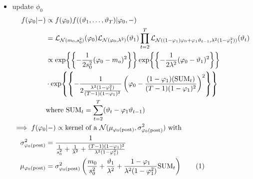 \documentclass[12pt,	%
	a4paper,		%
	twoside,		%
	openright,		%
	titlepage,%
	]{book}
\theoremstyle{definition}
\begin{document}
\begin{itemize}
\item update $\phi_0$
\begin{align*}
        f(\phi_0|-) &\propto f(\phi_0) f((\theta_1,\ldots,\theta_T)|\phi_0,-) \\
        &= \law_{\N(m_0,s^2_0)}(\phi_0) \law_{\N(\phi_0,\lambda^2)}(\theta_1) \prod_{t=2}^T \L_{\N((1-\phi_1)\phi_0 + \phi_1\theta_{t-1},\lambda^2(1-\phi_1^2))}(\theta_t)\\
        &\propto \exp{\left\{-\frac{1}{2s_0^2}(\phi_0-m_o)^2\right\}}\exp{\left\{-\frac{1}{2\lambda^2}(\phi_0-\theta_1)^2\right\}}\\
        & \cdot \exp{\left\{-\frac{1}{2\frac{\lambda^2(1-\phi_1^2)}{(T-1)(1-\phi_1)^2}}\left(\phi_0-\frac{(1-\phi_1)(\text{SUM}_t)}{(T-1)(1-\phi_1)^2}\right)^2\right\}}\\& \text{where SUM}_t = \sum_{t=2}^T(\theta_t-\phi_1\theta_{t-1})\\
    \implies f(\phi_0&|-) \propto \text{kernel of a $\N(\mu_{\phi_0\post},\sigma^{2}_{\phi_0\post})$ with}\\
    \sigma^{2}_{\postp{\phi_0}} &= \dfrac{1}{\frac{1}{s_0^2}+\frac{1}{\lambda^2}+\frac{(T-1)(1-\phi_1)^2}{\lambda^2(1-\phi_1^2)}}\\
    \mu_{\phi_0\post} &= \sigma^{2}_{\phi_0\post} \left(\dfrac{m_0}{s_0^2}+\dfrac{\theta_1}{\lambda^2}+\dfrac{1-\phi_1}{\lambda^2(1-\phi_1^2)}\text{SUM}_t\right)
\tag{\stepcounter{equation}\theequation}
\end{align*}


\end{itemize}
\end{document}
